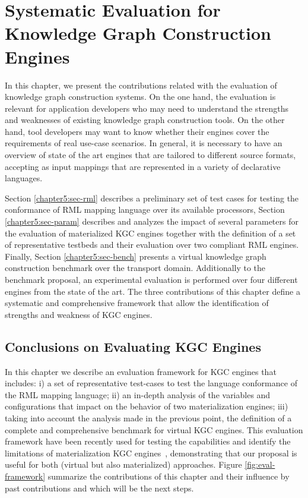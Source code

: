 \chapter{Systematic Evaluation for Knowledge Graph Construction Engines}
\label{chapter:evaluation}
In this chapter, we present the contributions related with the evaluation of knowledge graph construction systems. On the one hand, the evaluation is relevant for application developers who may need to understand the strengths and weaknesses of existing knowledge graph construction tools. On the other hand, tool developers may want to know whether their engines cover the requirements of real use-case scenarios. In general, it is necessary to have an overview of state of the art engines that are tailored to different source formats, accepting as input mappings that are represented in a variety of declarative languages. 

 Section \ref{chapter5:sec-rml} describes a preliminary set of test cases for testing the conformance of RML mapping language over its available processors, Section \ref{chapter5:sec-param} describes and analyzes the impact of several parameters for the evaluation of materialized KGC engines together with the definition of a set of representative testbeds and their evaluation over two compliant RML engines. Finally, Section \ref{chapter5:sec-bench} presents a virtual knowledge graph construction benchmark over the transport domain. Additionally to the benchmark proposal, an experimental evaluation is performed over four different engines from the state of the art. The three contributions of this chapter define a systematic and comprehensive framework that allow the identification of strengths and weakness of KGC engines.








\section{Conclusions on Evaluating KGC Engines}
In this chapter we describe an evaluation framework for KGC engines that includes: i) a set of representative test-cases to test the language conformance of the RML mapping language; ii) an in-depth analysis of the variables and configurations that impact on the behavior of two materialization engines; iii) taking into account the analysis made in the previous point, the definition of a complete and comprehensive benchmark for virtual KGC engines. This evaluation framework have been recently used for testing the capabilities and identify the limitations of materialization KGC engines~\citep{arenas2021knowledge}, demonstrating that our proposal is useful for both (virtual but also materialized) approaches. Figure \ref{fig:eval-framework} summarize the contributions of this chapter and their influence by past contributions and which will be the next steps.

